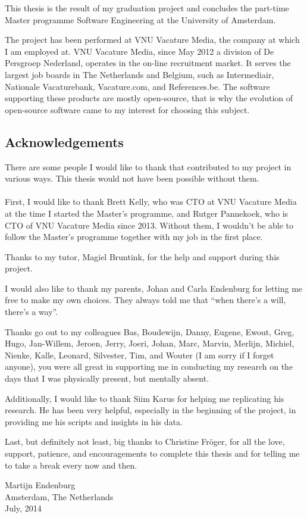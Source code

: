 This thesis is the result of my graduation project and concludes the part-time
Master programme Software Engineering at the University of Amsterdam.

The project has been performed at VNU Vacature Media, the company at which I am
employed at. VNU Vacature Media, since May 2012 a division of De Persgroep
Nederland, operates in the on-line recruitment market. It serves the largest
job boards in The Netherlands and Belgium, such as Intermediair, Nationale
Vacaturebank, Vacature.com, and References.be. The software supporting these
products are mostly open-source, that is why the evolution of open-source
software came to my interest for choosing this subject.

\subsection*{Acknowledgements}
There are some people I would like to thank that contributed to my project
in various ways. This thesis would not have been possible without them.

\paragraph{}
First, I would like to thank Brett Kelly, who was CTO at VNU Vacature Media at
the time I started the Master's programme, and Rutger Pannekoek, who is CTO of
VNU Vacature Media since 2013. Without them, I wouldn't be able to follow the
Master's programme together with my job in the first place.

Thanks to my tutor, Magiel Bruntink, for the help and support during this
project.

I would also like to thank my parents, Johan and Carla Endenburg for letting me
free to make my own choices. They always told me that ``when there's a will,
there's a way''.

Thanks go out to my colleagues
Bas,
Boudewijn,
Danny,
Eugene,
Ewout,
Greg,
Hugo,
Jan-Willem,
Jeroen,
Jerry,
Joeri,
Johan,
Marc,
Marvin,
Merlijn,
Michiel,
Nienke,
Kalle,
Leonard,
Silvester,
Tim,
and Wouter
(I am sorry if I forget anyone), you were all great in supporting me in
conducting my research on the days that I was physically present, but mentally
absent.

Additionally, I would like to thank Siim Karus for helping me replicating his
research. He has been very helpful, especially in the beginning of the project,
in providing me his scripts and insights in his data.

Last, but definitely not least, big thanks to Christine Fr\"{o}ger, for all the
love, support, patience, and encouragements to complete this thesis and for
telling me to take a break every now and then.\\[2em]

\begin{flushright}
Martijn Endenburg\\
Amsterdam, The Netherlands\\
July, 2014
\end{flushright}
